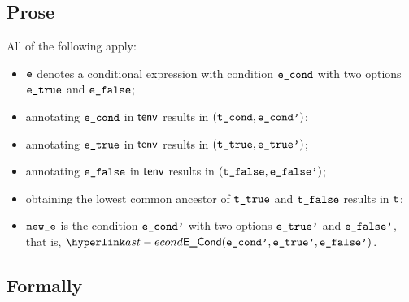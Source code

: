 \subsection{Prose}
All of the following apply:
\begin{itemize}
  \item $\ve$ denotes a conditional expression with condition $\econd$ with two options $\etrue$ and $\efalse$;
  \item annotating $\econd$ in $\tenv$ results in $(\tcond, \econdp)$\ProseOrTypeError;
  \item annotating $\etrue$ in $\tenv$ results in $(\ttrue, \etruep)$\ProseOrTypeError;
  \item annotating $\efalse$ in $\tenv$ results in $(\tfalse, \efalsep)$;
  \item obtaining the lowest common ancestor of $\ttrue$ and $\tfalse$ results in $\vt$\ProseOrTypeError;
  \item $\newe$ is the condition $\econdp$ with two options $\etruep$ and $\efalsep$, that is, $\ECond(\econdp, \etruep, \efalsep)$.
\end{itemize}



\subsection{Formally}
\begin{mathpar}
\end{mathpar}

